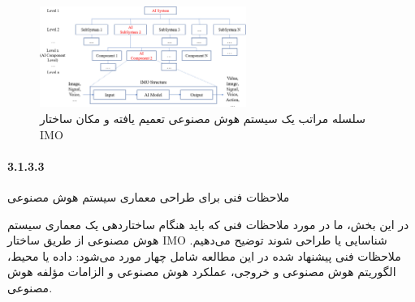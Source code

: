\documentclass[a4paper,10pt]{article}
\begin{document}
                    \begin{figure}[htbp]

                        \centering
                        \includegraphics[width=0.6\textwidth]{image/fig 3.png}
                        \caption{سلسله مراتب یک سیستم هوش مصنوعی تعمیم یافته و مکان ساختار IMO}
                        \label{fig:fig_3}
                    
                    \end{figure}

                \paragraph*{3.1.3.3}{ملاحظات فنی برای طراحی معماری سیستم هوش مصنوعی}

                    در این بخش، ما در مورد ملاحظات فنی که باید هنگام ساختاردهی یک معماری سیستم هوش مصنوعی از طریق ساختار IMO شناسایی یا طراحی شوند توضیح می‌دهیم. ملاحظات فنی پیشنهاد شده در این مطالعه شامل چهار مورد می‌شود: داده یا محیط، الگوریتم هوش مصنوعی و خروجی، عملکرد هوش مصنوعی و الزامات مؤلفه هوش مصنوعی.
\end{document}
